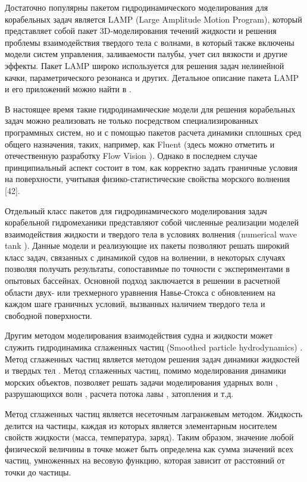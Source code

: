 Достаточно популярны пакетом гидродинамического моделирования для корабельных задач является LAMP (Large Amplitude Motion Program), который представляет собой пакет 3D-моделирования течений жидкости и решения проблемы взаимодействия твердого тела с волнами, в который также включены модели систем управления, заливаемости палубы, учет сил вязкости и другие эффекты. Пакет LAMP широко используется для решения задач нелинейной качки, параметрического резонанса и других. Детальное описание пакета LAMP и его приложений можно найти в \citep{dk39}\citep{dk40}. 

В настоящее время такие гидродинамические модели для решения корабельных задач можно реализовать не только посредством специализированных программных систем, но и с помощью пакетов расчета динамики сплошных сред общего назначения, таких, например, как Fluent (здесь можно отметить и отечественную разработку Flow Vision \citep{dk41}). Однако в последнем случае принципиальный аспект состоит в том, как корректно задать граничные условия на поверхности, учитывая физико-статистические свойства морского волнения [42].

Отдельный класс пакетов для гидродинамического моделирования задач корабельной гидромеханики представляют собой численные реализации моделей взаимодействия жидкости и твердого тела в условиях волнения (numerical wave tank \citep{dk41}\citep{dk42}\citep{dk43}\citep{dk44}). Данные модели и реализующие их пакеты позволяют решать широкий класс задач, связанных с динамикой судов на волнении, в некоторых случаях позволяя получать результаты, сопоставимые по точности с экспериментами в опытовых бассейнах. Основной подход заключается в решении в расчетной области двух- или трехмерного уравнения Навье-Стокса с обновлением на каждом шаге граничных условий, вызванных наличием твердого тела и свободной поверхности.

Другим методом моделирования взаимодействия судна и жидкости может служить гидродинамика сглаженных частиц (Smoothed particle hydrodynamics) \citep{dk45}. Метод сглаженных частиц является методом решения задач динамики жидкостей и твердых тел \citep{dk46}. Метод сглаженных частиц, помимо моделирования динамики морских объектов, позволяет решать задачи моделирования ударных волн \citep{dk47}, разрушающихся волн \citep{dk48}, расчета потока лавы \citep{dk49}, затопления \citep{dk50} и т.д.

Метод сглаженных частиц является несеточным лагранжевым методом. Жидкость делится на частицы, каждая из которых является элементарным носителем свойств жидкости (масса, температура, заряд). Таким образом, значение любой физической величины в точке может быть определена как сумма значений всех частиц, умноженных на весовую функцию, которая зависит от расстояний от точки до частицы.

